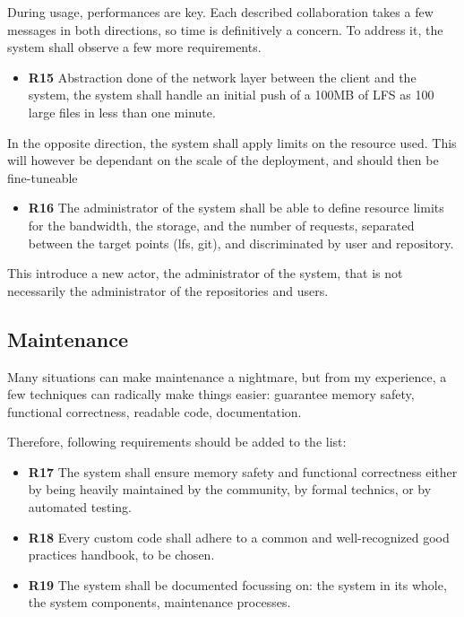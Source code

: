 During usage, performances are key. Each described collaboration takes a few messages in both directions, so time is definitively a concern. To address it, the system shall observe a few more requirements. 

\begin{itemize}
    \item \textbf{R15} Abstraction done of the network layer between the client and the system, the system shall handle an initial push of a 100MB of LFS as 100 large files in less than one minute.  
\end{itemize}

In the opposite direction, the system shall apply limits on the resource used. This will however be dependant on the scale of the deployment, and should then be fine-tuneable

\begin{itemize}
    \item \textbf{R16} The administrator of the system shall be able to define resource limits for the bandwidth, the storage, and the number of requests, separated between the target points (lfs, git), and discriminated by user and repository.
\end{itemize}

This introduce a new actor, the administrator of the system, that is not necessarily the administrator of the repositories and users. 

\subsection{Maintenance}

Many situations can make maintenance a nightmare, but from my experience, a few techniques can radically make things easier: guarantee memory safety, functional correctness, readable code, documentation. 

Therefore, following requirements should be added to the list: 

\begin{itemize}
    \item \textbf{R17} The system shall ensure memory safety and functional correctness either by being heavily maintained by the community, by formal technics, or by automated testing. 
    \item \textbf{R18} Every custom code shall adhere to a common and well-recognized good practices handbook, to be chosen. 
    \item \textbf{R19} The system shall be documented focussing on: the system in its whole, the system components, maintenance processes. 
\end{itemize}
